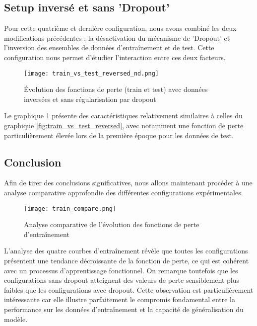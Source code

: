 \documentclass{article}
\begin{document}
\newpage
\subsection{Setup inversé et sans 'Dropout'}

Pour cette quatrième et dernière configuration, nous avons combiné les deux modifications précédentes : la désactivation du mécanisme de 'Dropout' et l'inversion des ensembles de données d'entraînement et de test. Cette configuration nous permet d'étudier l'interaction entre ces deux facteurs.

\begin{figure}[H]
    \centering
    \texttt{[image: train\_vs\_test\_reversed\_nd.png]}
    \caption{Évolution des fonctions de perte (train et test) avec données inversées et sans régularisation par dropout}
    \label{fig:train_vs_test_reversed_nd}
\end{figure}

Le graphique \ref{fig:train_vs_test_reversed_nd} présente des caractéristiques relativement similaires à celles du graphique \ref{fig:train_vs_test_reversed}, avec notamment une fonction de perte particulièrement élevée lors de la première époque pour les données de test.

\newpage
\subsection{Conclusion}

Afin de tirer des conclusions significatives, nous allons maintenant procéder à une analyse comparative approfondie des différentes configurations expérimentales.

\begin{figure}[H]
    \centering
    \texttt{[image: train\_compare.png]}
    \caption{Analyse comparative de l'évolution des fonctions de perte d'entraînement}
    \label{fig:train_compare}
\end{figure}

L'analyse des quatre courbes d'entraînement révèle que toutes les configurations présentent une tendance décroissante de la fonction de perte, ce qui est cohérent avec un processus d'apprentissage fonctionnel. On remarque toutefois que les configurations sans dropout atteignent des valeurs de perte sensiblement plus faibles que les configurations avec dropout. Cette observation est particulièrement intéressante car elle illustre parfaitement le compromis fondamental entre la performance sur les données d'entraînement et la capacité de généralisation du modèle.
\end{document}
